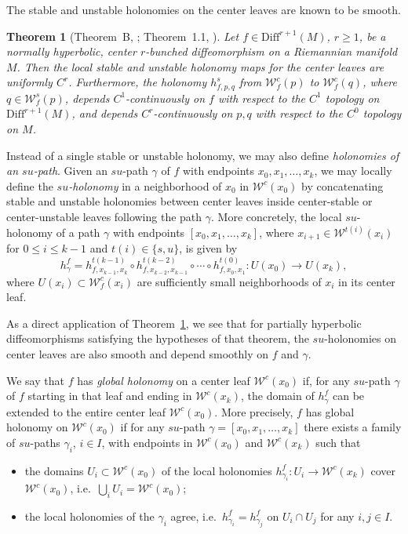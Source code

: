 \documentclass[11pt]{amsart}
\numberwithin{equation}{section}
\newcommand{\W}{\mathcal{W}}
\theoremstyle{plain}
\newtheorem{thm}{Theorem}[section]
\begin{document}
The stable and unstable holonomies on the center leaves are known to be smooth.

\begin{thm}[Theorem~B, \cite{PSW}; Theorem~1.1, \cite{Saghin}]\label{c1hol}
Let $f\in \mathrm{Diff}^{r+1}(M)$, $r\ge 1$, be a normally hyperbolic, center $r$-bunched diffeomorphism on a Riemannian manifold $M$. Then the local stable and unstable holonomy maps for the center leaves are uniformly $C^r$. Furthermore, the holonomy $h^s_{f,p,q}$ from $\W^c_f(p)$ to $\W^c_f(q)$, where $q\in \W^s_f(p)$, depends $C^1$-continuously on $f$ with respect to the $C^1$ topology on $\mathrm{Diff}^{r+1}(M)$, and depends $C^r$-continuously on $p,q$ with respect to the $C^0$ topology on $M$.
\end{thm}

Instead of a single stable or unstable holonomy, we may also define \emph{holonomies of an $su$-path}. Given an $su$-path $\gamma$ of $f$ with endpoints $x_0,x_1,\ldots,x_k$, we may locally define the \emph{$su$-holonomy} in a neighborhood of $x_0$ in $\W^c(x_0)$ by concatenating stable and unstable holonomies between center leaves inside center-stable or center-unstable leaves following the path $\gamma$. More concretely, the local $su$-holonomy of a path $\gamma$ with endpoints $[x_0,x_1,\ldots,x_k]$, where $x_{i+1}\in \W^{t(i)}(x_i)$ for $0\le i\le k-1$ and $t(i)\in\{s,u\}$, is given by
\[
h_\gamma^f
= h^{t(k-1)}_{f,x_{k-1},x_k}\circ h^{t(k-2)}_{f,x_{k-2},x_{k-1}}
\circ \cdots \circ h^{t(0)}_{f,x_0,x_1}
: U(x_0)\to U(x_k),
\]
where $U(x_i)\subset \W^c_f(x_i)$ are sufficiently small neighborhoods of $x_i$ in its center leaf.

As a direct application of Theorem~\ref{c1hol}, we see that for partially hyperbolic diffeomorphisms satisfying the hypotheses of that theorem, the $su$-holonomies on center leaves are also smooth and depend smoothly on $f$ and $\gamma$.

We say that $f$ has \emph{global holonomy} on a center leaf $\W^c(x_0)$ if, for any $su$-path $\gamma$ of $f$ starting in that leaf and ending in $\W^c(x_k)$, the domain of $h_\gamma^f$ can be extended to the entire center leaf $\W^c(x_0)$. More precisely, $f$ has global holonomy on $\W^c(x_0)$ if for any $su$-path $\gamma=[x_0,x_1,\ldots,x_k]$ there exists a family of $su$-paths $\gamma_i$, $i\in I$, with endpoints in $\W^c(x_0)$ and $\W^c(x_k)$ such that
\begin{itemize}
\item the domains $U_i\subset \W^c(x_0)$ of the local holonomies $h_{\gamma_i}^f:U_i\to \W^c(x_k)$ cover $\W^c(x_0)$, i.e.\ $\bigcup_i U_i=\W^c(x_0)$;

\item the local holonomies of the $\gamma_i$ agree, i.e.\ $h_{\gamma_i}^f=h_{\gamma_j}^f$ on $U_i\cap U_j$ for any $i,j\in I$.
\end{itemize}
\end{document}
